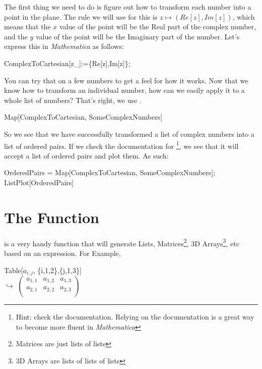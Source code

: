 The first thing we need to do is figure out how to transform each number into a point in the plane. The rule we will use for this is $z \mapsto (Re[z], Im[z])$, which means that the $x$ value of the point will be the Real part of the complex number, and the $y$ value of the point will be the Imaginary part of the number. Let's express this in \emph{Mathematica} as follows:

\begin{code}
	   ComplexToCartesian[z\_]:=\{Re[z],Im[z]\};
\end{code}

You can try that on a few numbers to get a feel for how it works. Now that we know how to transform an individual number, how can we easily apply it to a whole list of numbers? That's right, we use .

\begin{code}
	   Map[ComplexToCartesian, SomeComplexNumbers]\\
\end{code}

So we see that we have successfully transformed a list of complex numbers into a list of ordered pairs. If we check the documentation for \footnote{Hint: check the documentation. Relying on the documentation is a great way to become more fluent in \emph{Mathematica} }, we see that it will accept a list of ordered pairs and plot them. As such:

\begin{code}
	   OrderedPairs = Map[ComplexToCartesian, SomeComplexNumbers];\\
	   ListPlot[OrderedPairs]
\end{code}

\section{The  Function}

 is a very handy function that will generate Lists, Matrices\footnote{Matrices are just lists of lists}, 3D Arrays\footnote{3D Arrays are lists of lists of lists}, etc based on an expression. For Example,

\begin{code}
	   Table[$a_{i,j}$, \{i,1,2\},\{j,1,3\}]\\
	   $\hookrightarrow$ $\left( \begin{array}{ccc} 
			   a_{1,1} & a_{1,2} & a_{1,3} \\
			   a_{2,1} & a_{2,2} & a_{2,3} \\
		\end{array} \right)$
\end{code}


